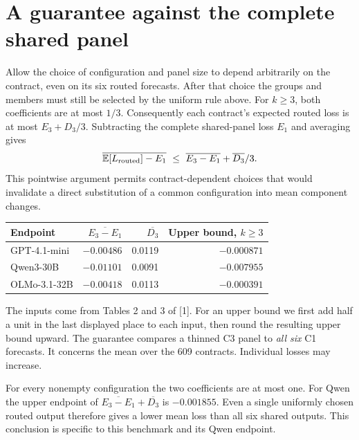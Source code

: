 \documentclass[11pt]{article}
\begin{document}
\section{A guarantee against the complete shared panel}
Allow the choice of configuration and panel size to depend arbitrarily on the contract, even on its six routed forecasts. After that choice the groups and members must still be selected by the uniform rule above. For $k\ge3$, both coefficients are at most $1/3$. Consequently each contract's expected routed loss is at most $E_3+D_3/3$. Subtracting the complete shared-panel loss $E_1$ and averaging gives
\[
  \overline{\mathbb E[L_{\rm routed}]-E_1}
  \ \le\ \overline{E_3-E_1}+\overline{D_3}/3 .
\]
This pointwise argument permits contract-dependent choices that would invalidate a direct substitution of a common configuration into mean component changes.

\begin{center}
\begin{tabular}{lrrr}
\toprule
Endpoint& $\overline{E_3-E_1}$ & $\overline{D_3}$ & Upper bound, $k\ge3$\\
\midrule
GPT-4.1-mini & $-0.00486$&0.0119&$-0.000871$\\
Qwen3-30B & $-0.01101$&0.0091&$-0.007955$\\
OLMo-3.1-32B & $-0.00418$&0.0113&$-0.000391$\\
\bottomrule
\end{tabular}
\end{center}
The inputs come from Tables 2 and 3 of [1]. For an upper bound we first add half a unit in the last displayed place to each input, then round the resulting upper bound upward. The guarantee compares a thinned C3 panel to \emph{all six} C1 forecasts. It concerns the mean over the 609 contracts. Individual losses may increase.

For every nonempty configuration the two coefficients are at most one. For Qwen the upper endpoint of $\overline{E_3-E_1}+\overline{D_3}$ is $-0.001855$. Even a single uniformly chosen routed output therefore gives a lower mean loss than all six shared outputs. This conclusion is specific to this benchmark and its Qwen endpoint.
\end{document}
